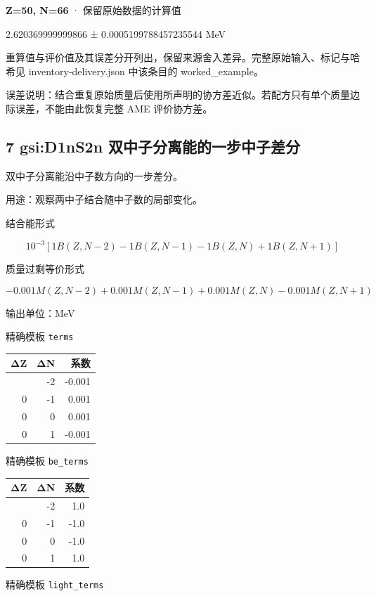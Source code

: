 \documentclass[
  11pt,
  letterpaper,
]{article}
\begin{document}
\textbf{Z=50, N=66} · 保留原始数据的计算值

2.620369999999866 ± 0.0005199788457235544 MeV

重算值与评价值及其误差分开列出，保留来源舍入差异。完整原始输入、标记与哈希见
inventory-delivery.json 中该条目的 worked\_example。

误差说明：结合重复原始质量后使用所声明的协方差近似。若配方只有单个质量边际误差，不能由此恢复完整
AME 评价协方差。

\subsection{7 gsi:D1nS2n
双中子分离能的一步中子差分}\label{gsid1ns2n-ux53ccux4e2dux5b50ux5206ux79bbux80fdux7684ux4e00ux6b65ux4e2dux5b50ux5deeux5206}

双中子分离能沿中子数方向的一步差分。

用途：观察两中子结合随中子数的局部变化。

结合能形式

\[
10^{-3}[1B(Z,N-2)-1B(Z,N-1)-1B(Z,N)+1B(Z,N+1)]
\]

质量过剩等价形式

\[
-0.001M(Z,N-2)+0.001M(Z,N-1)+0.001M(Z,N)-0.001M(Z,N+1)
\]

输出单位：MeV

精确模板 \texttt{terms}

\begin{longtable}[]{@{}rrr@{}}
\toprule\noalign{}
ΔZ & ΔN & 系数 \\
\midrule\noalign{}
\endhead
\bottomrule\noalign{}
\endlastfoot
0 & -2 & -0.001 \\
0 & -1 & 0.001 \\
0 & 0 & 0.001 \\
0 & 1 & -0.001 \\
\end{longtable}

精确模板 \texttt{be\_terms}

\begin{longtable}[]{@{}rrr@{}}
\toprule\noalign{}
ΔZ & ΔN & 系数 \\
\midrule\noalign{}
\endhead
\bottomrule\noalign{}
\endlastfoot
0 & -2 & 1.0 \\
0 & -1 & -1.0 \\
0 & 0 & -1.0 \\
0 & 1 & 1.0 \\
\end{longtable}

精确模板 \texttt{light\_terms}
\end{document}
